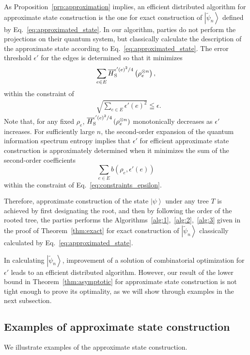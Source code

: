 \documentclass[preprintnumbers,aps,amsmath,amssymb,pra,twocolumn,showpacs,superscriptaddress,floatfix]{revtex4-1}
\def\Ket#1{\left|#1\right\rangle}
\theoremstyle{plain}
\theoremstyle{definition}
\theoremstyle{remark}
\begin{document}
As Proposition~\ref{prp:approximation} implies, an efficient distributed algorithm for approximate state construction is the one for exact construction of $\Ket{\tilde\psi_n}$ defined by Eq.~\eqref{eq:approximated_state}.  In our algorithm, parties do not perform the projections on their quantum system, but classically calculate the description of the approximate state according to Eq.~\eqref{eq:approximated_state}. 
The error threshold $\epsilon'$ for the edges is determined so that it minimizes
\[
    \sum_{e\in E}\overline{H}_{\textup{S}}^{{\epsilon'(e)}^2/4}\left(\rho_e^{\otimes n}\right),
\]
within the constraint of
\begin{equation}
\label{eq:constraints_epsilon}
\begin{split}
    &\sqrt{\sum_{e\in E}{\epsilon'(e)}^2}\leqq\epsilon.
\end{split}
\end{equation}
Note that, for any fixed $\rho_e$, $\overline{H}_{\textup{S}}^{{\epsilon'(e)}^2/4}\left(\rho_e^{\otimes n}\right)$ monotonically decreases as $\epsilon'$ increases.
For sufficiently large $n$, the second-order expansion of the quantum information spectrum entropy implies that $\epsilon'$ for efficient approximate state construction is approximately determined when it minimizes the sum of the second-order coefficients
\[
    \sum_{e\in E}b\left(\rho_e,\epsilon'(e)\right)
\]
within the constraint of Eq.~\eqref{eq:constraints_epsilon}.

Therefore, approximate construction of the state $\Ket{\psi}$ under any tree $T$ is achieved by first designating the root, and then by following the order of the rooted tree, the parties performs the Algorithms~\ref{alg:1},~\ref{alg:2},~\ref{alg:3} given in the proof of Theorem~\ref{thm:exact} for exact construction of $\Ket{\tilde\psi_n}$ classically calculated by Eq.~\eqref{eq:approximated_state}.

In calculating $\Ket{\tilde\psi_n}$, improvement of a solution of combinatorial optimization for $\epsilon'$ leads to an efficient distributed algorithm.  However, our result of the lower bound in Theorem~\ref{thm:asymptotic} for approximate state construction is not tight enough to prove its optimality, as we will show through examples in the next subsection.

\subsection{Examples of approximate state construction}
We illustrate examples of the approximate state construction.
\end{document}
